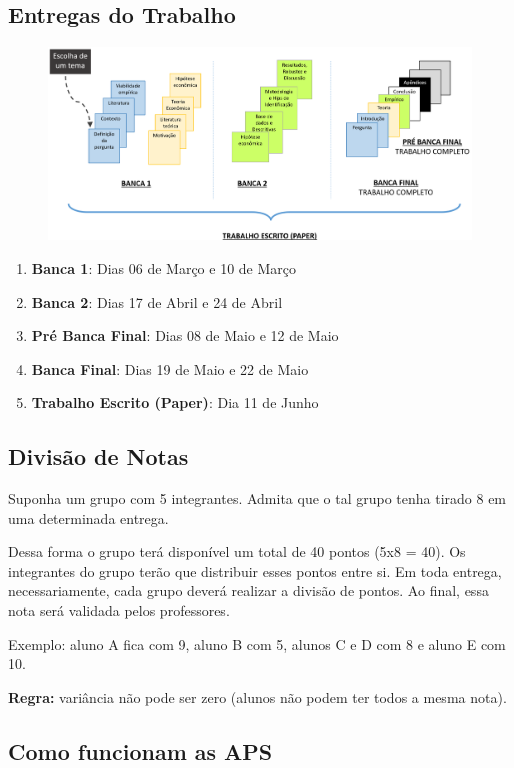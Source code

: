 \documentclass[a4paper,12pt]{article}[abnt2]
\begin{document}
\subsection{\textbf{Entregas do Trabalho}}
\begin{figure}[H]
    \centering
    \includegraphics[width=0.75\linewidth]{Imagens/a1i3.png}
\end{figure}

\begin{enumerate}
    \item \textbf{Banca 1}: Dias 06 de Março e 10 de Março
    \item \textbf{Banca 2}: Dias 17 de Abril e 24 de Abril
    \item \textbf{Pré Banca Final}: Dias 08 de Maio e 12 de Maio
    \item \textbf{Banca Final}: Dias 19 de Maio e 22 de Maio
    \item \textbf{Trabalho Escrito (Paper)}: Dia 11 de Junho
\end{enumerate}

\subsection{\textbf{Divisão de Notas}}

Suponha um grupo com 5 integrantes. Admita que o tal grupo tenha tirado 8 em uma determinada entrega.

Dessa forma o grupo terá disponível um total de 40 pontos (5x8 = 40).  Os integrantes do grupo terão que distribuir esses pontos entre si. Em toda entrega, necessariamente, cada grupo deverá realizar a divisão de pontos. Ao final, essa nota será validada pelos professores. 

Exemplo: aluno A fica com 9, aluno B com 5, alunos C e D com 8 e aluno E com 10.

\textbf{Regra:} variância não pode ser zero (alunos não podem ter todos a mesma nota).

\subsection{\textbf{Como funcionam as APS}}
\end{document}
